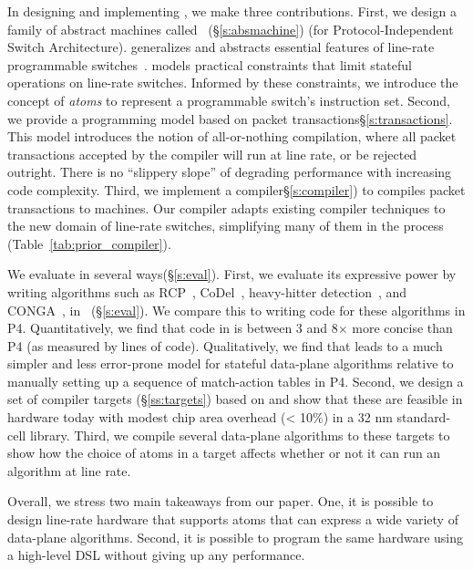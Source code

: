 In designing and implementing \pktlanguage, we make three contributions.
First, we design a family of abstract machines called
\absmachine~(\S\ref{s:absmachine}) (for Protocol-Independent Switch
Architecture). \absmachine generalizes and abstracts essential features of
line-rate programmable switches~\cite{rmt, xpliant, flexpipe}. \absmachine
models practical constraints that limit stateful operations on line-rate
switches.  Informed by these constraints, we introduce the concept of {\em
atoms} to represent a programmable switch's instruction set.  Second, we
provide a programming model based on packet transactions\S\ref{s:transactions}.
This model introduces the notion of all-or-nothing compilation, where all
packet transactions accepted by the compiler will run at line rate, or be
rejected outright. There is no ``slippery slope'' of degrading performance with
increasing code complexity.  Third, we implement a compiler\S\ref{s:compiler})
to compiles packet transactions to \absmachine machines. Our compiler adapts
existing compiler techniques to the new domain of line-rate switches,
simplifying many of them in the process (Table~\ref{tab:prior_compiler}).

We evaluate \pktlanguage in several ways(\S\ref{s:eval}). First, we evaluate
its expressive power by writing algorithms such as RCP~\cite{rcp},
CoDel~\cite{codel}, heavy-hitter detection~\cite{opensketch}, and
CONGA~\cite{conga}, in \pktlanguage~(\S\ref{s:eval}). We compare this to
writing code for these algorithms in P4. Quantitatively, we find that code in
\pktlanguage is between 3 and 8$\times$ more concise than P4 (as measured by
lines of code).  Qualitatively, we find that \pktlanguage leads to a much
simpler and less error-prone model for stateful data-plane algorithms relative
to manually setting up a sequence of match-action tables in P4.  Second, we
design a set of compiler targets (\S\ref{ss:targets}) based on \absmachine and
show that these are feasible in hardware today with modest chip area overhead
(< 10\%) in a 32 nm standard-cell library. Third, we compile several data-plane
algorithms to these targets to show how the choice of atoms in a target affects
whether or not it can run an algorithm at line rate.

Overall, we stress two main takeaways from our paper. One, it is possible to
design line-rate hardware that supports atoms that can express a wide variety
of data-plane algorithms. Second, it is possible to program the same hardware
using a high-level DSL without giving up any performance.
